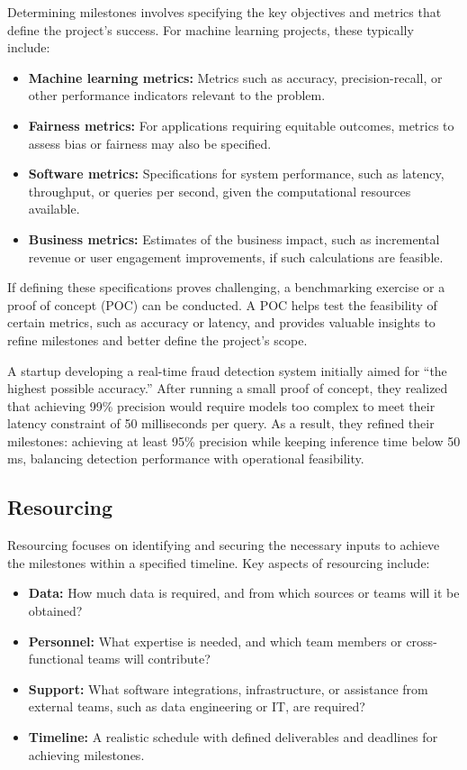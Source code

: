 \documentclass[12pt,openany]{book}
\begin{document}
Determining milestones involves specifying the key objectives and metrics that define the project's success. For machine learning projects, these typically include:
\begin{itemize}
    \item \textbf{Machine learning metrics:} Metrics such as accuracy, precision-recall, or other performance indicators relevant to the problem.
    \item \textbf{Fairness metrics:} For applications requiring equitable outcomes, metrics to assess bias or fairness may also be specified.
    \item \textbf{Software metrics:} Specifications for system performance, such as latency, throughput, or queries per second, given the computational resources available.
    \item \textbf{Business metrics:} Estimates of the business impact, such as incremental revenue or user engagement improvements, if such calculations are feasible.
\end{itemize}

If defining these specifications proves challenging, a benchmarking exercise or a proof of concept (POC) can be conducted. A POC helps test the feasibility of certain metrics, such as accuracy or latency, and provides valuable insights to refine milestones and better define the project's scope.

\begin{examplebox}
A startup developing a real-time fraud detection system initially aimed for ``the highest possible accuracy.'' After running a small proof of concept, they realized that achieving 99\% precision would require models too complex to meet their latency constraint of 50 milliseconds per query. As a result, they refined their milestones: achieving at least 95\% precision while keeping inference time below 50 ms, balancing detection performance with operational feasibility.
\end{examplebox}


\subsection{Resourcing}

Resourcing focuses on identifying and securing the necessary inputs to achieve the milestones within a specified timeline. Key aspects of resourcing include:
\begin{itemize}
    \item \textbf{Data:} How much data is required, and from which sources or teams will it be obtained?
    \item \textbf{Personnel:} What expertise is needed, and which team members or cross-functional teams will contribute?
    \item \textbf{Support:} What software integrations, infrastructure, or assistance from external teams, such as data engineering or IT, are required?
    \item \textbf{Timeline:} A realistic schedule with defined deliverables and deadlines for achieving milestones.
\end{itemize}
\end{document}
